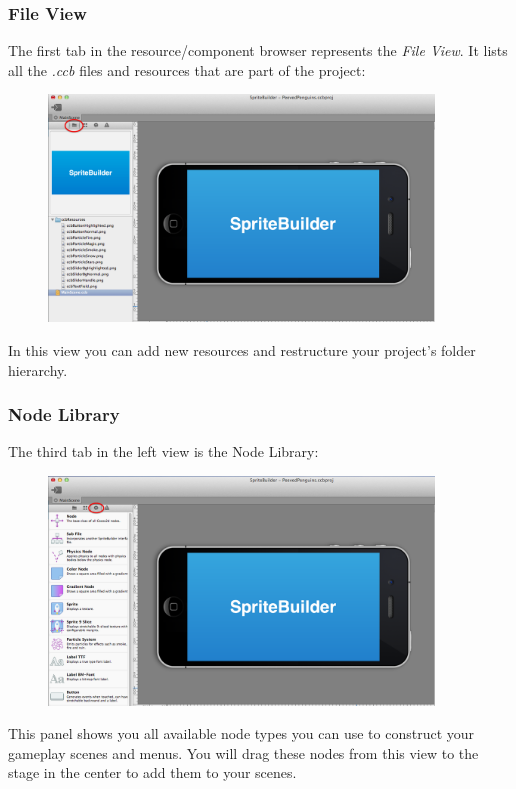 \subsubsection{File View}
The first tab in the resource/component browser represents the \textit{File
View}.
It lists all the \textit{.ccb} files and resources that are part of the \SB{}
project:
\begin{figure}[H]
		\centering
		\includegraphics[width=290pt]{images/spritebuilder/spritebuilder_fileview.png}     
\end{figure} 
In this view you can add new resources and restructure your project's folder
hierarchy.
\subsubsection{Node Library}
The third tab in the left view is the {Node Library}:
\begin{figure}[H]
		\centering
		\includegraphics[width=290pt]{images/spritebuilder/spritebuilder_nodeview.png}     
\end{figure} 
This panel shows you all available node types you can use to construct your
gameplay scenes and menus. You will drag these nodes from this view to the stage
in the center to add them to your scenes.


